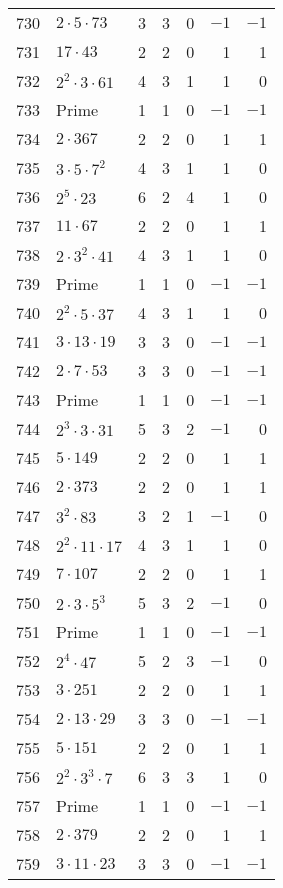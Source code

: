 \documentclass[12pt]{article}
\begin{document}
\begin{tabular}{|r|l|r|r|r|r|r|}
730 & $2 \cdot 5 \cdot 73$ & 3 & 3 & 0 & $-1$ & $-1$ \\
731 & $17 \cdot 43$ & 2 & 2 & 0 & 1 & 1 \\
732 & $2^2 \cdot 3 \cdot 61$ & 4 & 3 & 1 & 1 & 0 \\
733 & Prime & 1 & 1 & 0 & $-1$ & $-1$ \\
734 & $2 \cdot 367$ & 2 & 2 & 0 & 1 & 1 \\
735 & $3 \cdot 5 \cdot 7^2$ & 4 & 3 & 1 & 1 & 0 \\
736 & $2^5 \cdot 23$ & 6 & 2 & 4 & 1 & 0 \\
737 & $11 \cdot 67$ & 2 & 2 & 0 & 1 & 1 \\
738 & $2 \cdot 3^2 \cdot 41$ & 4 & 3 & 1 & 1 & 0 \\
739 & Prime & 1 & 1 & 0 & $-1$ & $-1$ \\
740 & $2^2 \cdot 5 \cdot 37$ & 4 & 3 & 1 & 1 & 0 \\
741 & $3 \cdot 13 \cdot 19$ & 3 & 3 & 0 & $-1$ & $-1$ \\
742 & $2 \cdot 7 \cdot 53$ & 3 & 3 & 0 & $-1$ & $-1$ \\
743 & Prime & 1 & 1 & 0 & $-1$ & $-1$ \\
744 & $2^3 \cdot 3 \cdot 31$ & 5 & 3 & 2 & $-1$ & 0 \\
745 & $5 \cdot 149$ & 2 & 2 & 0 & 1 & 1 \\
746 & $2 \cdot 373$ & 2 & 2 & 0 & 1 & 1 \\
747 & $3^2 \cdot 83$ & 3 & 2 & 1 & $-1$ & 0 \\
748 & $2^2 \cdot 11 \cdot 17$ & 4 & 3 & 1 & 1 & 0 \\
749 & $7 \cdot 107$ & 2 & 2 & 0 & 1 & 1 \\
750 & $2 \cdot 3 \cdot 5^3$ & 5 & 3 & 2 & $-1$ & 0 \\
751 & Prime & 1 & 1 & 0 & $-1$ & $-1$ \\
752 & $2^4 \cdot 47$ & 5 & 2 & 3 & $-1$ & 0 \\
753 & $3 \cdot 251$ & 2 & 2 & 0 & 1 & 1 \\
754 & $2 \cdot 13 \cdot 29$ & 3 & 3 & 0 & $-1$ & $-1$ \\
755 & $5 \cdot 151$ & 2 & 2 & 0 & 1 & 1 \\
756 & $2^2 \cdot 3^3 \cdot 7$ & 6 & 3 & 3 & 1 & 0 \\
757 & Prime & 1 & 1 & 0 & $-1$ & $-1$ \\
758 & $2 \cdot 379$ & 2 & 2 & 0 & 1 & 1 \\
759 & $3 \cdot 11 \cdot 23$ & 3 & 3 & 0 & $-1$ & $-1$ \\

\end{tabular}
\end{document}
